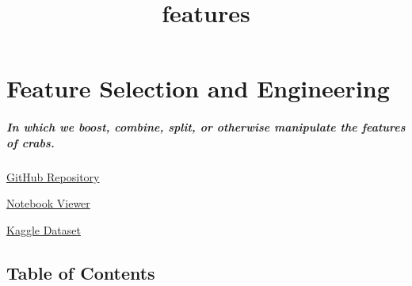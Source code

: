 \documentclass[11pt]{article}
\title{features}
\begin{document}
    
    \maketitle
    
    

    
    \section{Feature Selection and
Engineering}\label{feature-selection-and-engineering}

\subparagraph{\texorpdfstring{\emph{In which we boost, combine, split,
or otherwise manipulate the features of
crabs.}}{In which we boost, combine, split, or otherwise manipulate the features of crabs.}}\label{in-which-we-boost-combine-split-or-otherwise-manipulate-the-features-of-crabs.}

\href{https://github.com/ahester57/ai_workshop/tree/master/notebooks/time_for_crab/2-features}{GitHub
Repository}

\href{https://nbviewer.jupyter.org/github/ahester57/ai_workshop/blob/master/notebooks/time_for_crab/2-features/features.ipynb}{Notebook
Viewer}

\href{https://www.kaggle.com/sidhus/crab-age-prediction}{Kaggle Dataset}

    \subsection{Table of Contents}\label{table-of-contents}
\end{document}
